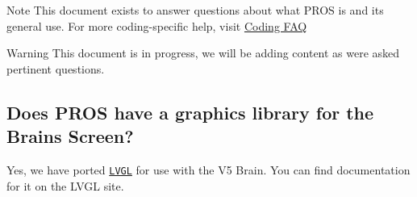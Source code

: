 \begin{DoxyNote}{Note}
This document exists to answer questions about what P\+R\+OS is and its general use. For more coding-\/specific help, visit \hyperlink{md_docs_tutorials_general_coding-faq}{Coding F\+AQ}
\end{DoxyNote}
\begin{DoxyWarning}{Warning}
This document is in progress, we will be adding content as we\textquotesingle{}re asked pertinent questions.
\end{DoxyWarning}
\subsection*{Does P\+R\+OS have a graphics library for the Brain\textquotesingle{}s Screen?}

Yes, we have ported \href{https://littlevgl.com/}{\tt L\+V\+GL} for use with the V5 Brain. You can find documentation for it on the L\+V\+GL site. 